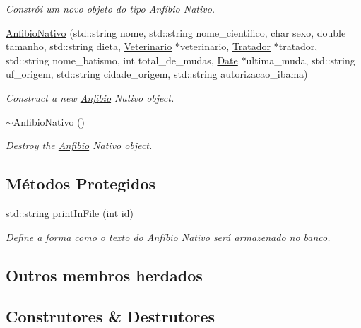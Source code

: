 \begin{DoxyCompactItemize}
\begin{DoxyCompactList}\small\item\em Constrói um novo objeto do tipo Anfíbio Nativo. \end{DoxyCompactList}\item 
\hyperlink{classAnfibioNativo_ab1365cbd0d3622c5ccacb61201aad444}{Anfibio\+Nativo} (std\+::string nome, std\+::string nome\+\_\+cientifico, char sexo, double tamanho, std\+::string dieta, \hyperlink{classVeterinario}{Veterinario} $\ast$veterinario, \hyperlink{classTratador}{Tratador} $\ast$tratador, std\+::string nome\+\_\+batismo, int total\+\_\+de\+\_\+mudas, \hyperlink{classDate}{Date} $\ast$ultima\+\_\+muda, std\+::string uf\+\_\+origem, std\+::string cidade\+\_\+origem, std\+::string autorizacao\+\_\+ibama)
\begin{DoxyCompactList}\small\item\em Construct a new \hyperlink{classAnfibio}{Anfibio} Nativo object. \end{DoxyCompactList}\item 
\mbox{\label{classAnfibioNativo_a10ecde482410d669995fd852ba150d75}} 
\hyperlink{classAnfibioNativo_a10ecde482410d669995fd852ba150d75}{$\sim$\+Anfibio\+Nativo} ()
\begin{DoxyCompactList}\small\item\em Destroy the \hyperlink{classAnfibio}{Anfibio} Nativo object. \end{DoxyCompactList}\end{DoxyCompactItemize}
\subsection*{Métodos Protegidos}
\begin{DoxyCompactItemize}
\item 
std\+::string \hyperlink{classAnfibioNativo_a7926e1af44542ee268e27dd3d862f583}{print\+In\+File} (int id)
\begin{DoxyCompactList}\small\item\em Define a forma como o texto do Anfíbio Nativo será armazenado no banco. \end{DoxyCompactList}\end{DoxyCompactItemize}
\subsection*{Outros membros herdados}


\subsection{Construtores \& Destrutores}
\mbox{\label{classAnfibioNativo_aea42e00a0890c29e8ba0ded0f280f3be}} 
